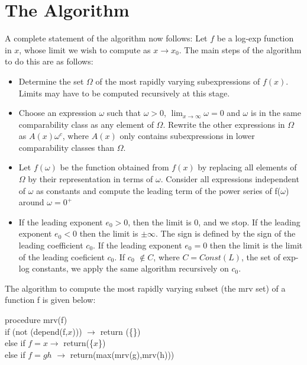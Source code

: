 {\section{The Algorithm}
A complete statement of the algorithm now follows:
Let $f$ be a log-exp function in $x$, whose limit we wish to compute as $x\rightarrow x_0.$ The main steps of the algorithm to do this are as follows: \\
\begin{itemize}
\item{Determine the set $\Omega$ of the most rapidly varying subexpressions of $f(x)$. Limits may have to be computed recursively at this stage.}
\item{Choose an expression $\omega$ such that $\omega>0$, $\lim_{x \rightarrow \infty} \omega=0 $ and $\omega$ is in the same comparability class as any element of $\Omega$. Rewrite the other expressions in $\Omega$ as $A(x)\omega^{c}$, where $A(x)$ only contains subexpressions in lower comparability classes than $\Omega$.}
\item{Let $f(\omega)$ be the function obtained from $f(x)$ by replacing all elements of $\Omega $ by their representation in terms of $\omega$. Consider all expressions independent of $\omega$ as constants and compute the leading term of the power series of f($\omega$) around $\omega=0^{+}$ }
\item{If the leading exponent $e_0>0$, then the limit is 0, and we stop. If the leading exponent $e_0<0$ then the limit is $\pm \infty$. The sign is defined by the sign of the leading coefficient $c_0$. If the leading exponent $e_0=0$ then the limit is the limit of the leading coeficient $c_0$. If $c_0$ $\not \in C$, where $C=Const(L)$, the set of exp-log constants, we apply the same algorithm recursively on $c_0$.} \\
\end{itemize}
The algorithm to compute the most rapidly varying subset (the mrv set) of a function f is given below:\\
\begin{tabbing}      
procedure mrv(f) \= \\ %
  if (not (depend(f,$x$)))  $\rightarrow$ return (\{\}) \\
  \> else if $f=x \rightarrow$   return(\{$x$\}) \\
 \> else if $f=gh$  $\rightarrow$   return(max(mrv(g),mrv(h))) \\

\end{tabbing}}
